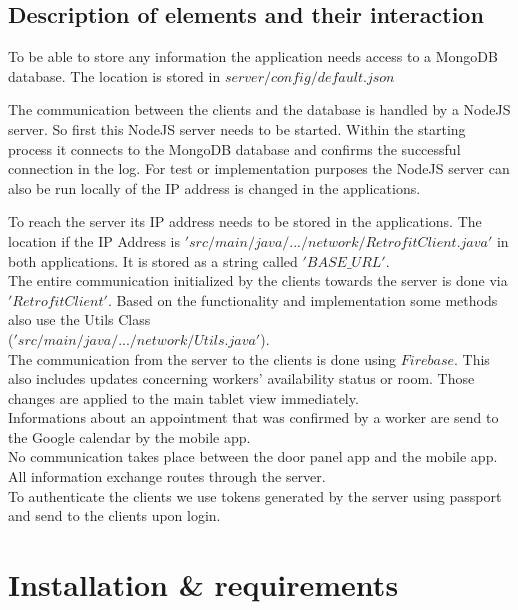 \documentclass[article,colorback,accentcolor=tud4c, 11pt]{tudreport}
\begin{document}
	
\subsection{Description of elements and their interaction}

To be able to store any information the application needs access to a MongoDB database. The location is stored in $server/config/default.json$

The communication between the clients and the database is handled by a NodeJS server. So first this NodeJS server needs to be started. Within the starting process it connects to the MongoDB database and confirms the successful connection in the log. For test or implementation purposes the NodeJS server can also be run locally of the IP address is changed in the applications.

To reach the server its IP address needs to be stored in the applications. The location if the IP Address is $'src/main/java/.../network/RetrofitClient.java'$ in both applications. It is stored as a string called $'BASE\_URL'$.\\ 
\newpage
The entire communication initialized by the clients towards the server is done via $'RetrofitClient'$. Based on the functionality and implementation some methods also use the Utils Class\\ ($'src/main/java/.../network/Utils.java'$).\\

The communication from the server to the clients is done using $Firebase$. This also includes updates concerning workers' availability status or room. Those changes are applied to the main tablet view immediately.\\

Informations about an appointment that was confirmed by a worker are send to the Google calendar by the mobile app.\\

No communication takes place between the door panel app and the mobile app. All information exchange routes through the server.\\


To authenticate the clients we use tokens generated by the server using passport and send to the clients upon login.\\



\section{Installation \& requirements}		
	
\end{document}
